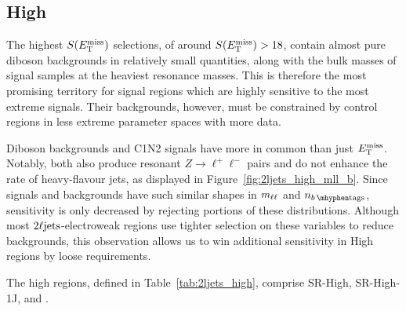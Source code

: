 \FloatBarrier
\subsection{High}
\label{sec:2ljets_high}
The highest $S(E_\mathrm{T}^\mathrm{miss})$ selections, of around $S(E_\mathrm{T}^\mathrm{miss}) > 18$, contain almost pure
diboson backgrounds in relatively small quantities, along with the bulk masses
of signal samples at the heaviest resonance masses.
This is therefore the most promising territory for signal regions which are
highly sensitive to the most extreme signals.
Their backgrounds, however, must be constrained by control regions in less
extreme parameter spaces with more data.

Diboson backgrounds and C1N2 signals have more in common than just $E_\mathrm{T}^\mathrm{miss}$.
Notably, both also produce resonant $Z\rightarrow \ell^+\ell^-$ pairs
and do not enhance the rate of heavy-flavour jets, as displayed in
Figure~\ref{fig:2ljets_high_mll_b}.
Since signals and backgrounds have such similar shapes in $m_{\ell\ell}$ and $\nbtag$,
sensitivity is only decreased by rejecting portions of these distributions.
Although most $2\ell\mathrm{jets}$-electroweak regions use tighter selection on these
variables to reduce backgrounds, this observation allows us to win
additional sensitivity in High regions by loose requirements.

The high regions, defined in Table~\ref{tab:2ljets_high}, comprise SR-High,
SR-High-1J, and \srllbb.

